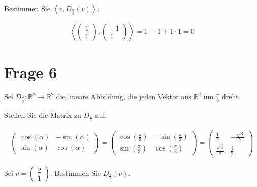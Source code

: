 Bestimmen Sie $\left<v, D_{\frac{\pi}{2}}(v)\right>$.

\begin{align*}
    \left< \begin{pmatrix}
               1 \\ 1
           \end{pmatrix}, \begin{pmatrix}
                              -1 \\ 1
                          \end{pmatrix}\right> = 1 \cdot -1 + 1 \cdot 1 = 0
\end{align*}

\section{Frage 6}

Sei $D_{\frac{\pi}{3}}: \mathbb{R}^2 \rightarrow \mathbb{R}^2$ die lineare
Abbildung, die jeden Vektor aus $\mathbb{R}^2$ um $\frac{\pi}{3}$ dreht.

Stellen Sie die Matrix zu $D_{\frac{\pi}{3}}$ auf.

\begin{align*}
    \begin{pmatrix}
        \cos(\alpha) & -\sin(\alpha) \\
        \sin(\alpha) & \cos(\alpha)
    \end{pmatrix} = \begin{pmatrix}
                        \cos(\frac{\pi}{3}) & -\sin(\frac{\pi}{3}) \\
                        \sin(\frac{\pi}{3}) & \cos(\frac{\pi}{3})
                    \end{pmatrix} =  \begin{pmatrix}
                                         \frac{1}{2}        & -\frac{\sqrt{3}}{2} \\
                                         \frac{\sqrt{3}}{2} & \frac{1}{2}
                                     \end{pmatrix}
\end{align*}

Sei $v = \begin{pmatrix}
        2 \\ 1
    \end{pmatrix}$. Bestimmen Sie $D_{\frac{\pi}{3}}(v)$.

